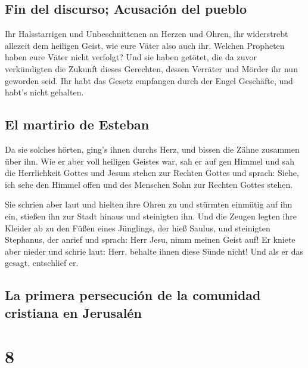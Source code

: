 \hypertarget{fin-del-discurso-acusaciuxf3n-del-pueblo}{%
\subsection{Fin del discurso; Acusación del
pueblo}\label{fin-del-discurso-acusaciuxf3n-del-pueblo}}

 Ihr Halsstarrigen und Unbeschnittenen an Herzen und
Ohren, ihr widerstrebt allezeit dem heiligen Geist, wie eure Väter also
auch ihr.  Welchen Propheten haben eure Väter nicht
verfolgt? Und sie haben getötet, die da zuvor verkündigten die Zukunft
dieses Gerechten, dessen Verräter und Mörder ihr nun geworden seid.
 Ihr habt das Gesetz empfangen durch der Engel Geschäfte,
und habt's nicht gehalten.

\hypertarget{el-martirio-de-esteban}{%
\subsection{El martirio de Esteban}\label{el-martirio-de-esteban}}

 Da sie solches hörten, ging's ihnen durchs Herz, und
bissen die Zähne zusammen über ihn.  Wie er aber voll
heiligen Geistes war, sah er auf gen Himmel und sah die Herrlichkeit
Gottes und Jesum stehen zur Rechten Gottes  und sprach:
Siehe, ich sehe den Himmel offen und des Menschen Sohn zur Rechten
Gottes stehen.

 Sie schrien aber laut und hielten ihre Ohren zu und
stürmten einmütig auf ihn ein, stießen ihn zur Stadt hinaus und
steinigten ihn.  Und die Zeugen legten ihre Kleider ab zu
den Füßen eines Jünglings, der hieß Saulus,  und
steinigten Stephanus, der anrief und sprach: Herr Jesu, nimm meinen
Geist auf!  Er kniete aber nieder und schrie laut: Herr,
behalte ihnen diese Sünde nicht! Und als er das gesagt, entschlief er.

\hypertarget{la-primera-persecuciuxf3n-de-la-comunidad-cristiana-en-jerusaluxe9n}{%
\subsection{La primera persecución de la comunidad cristiana en
Jerusalén}\label{la-primera-persecuciuxf3n-de-la-comunidad-cristiana-en-jerusaluxe9n}}

\hypertarget{section-7}{%
\section{8}\label{section-7}}

